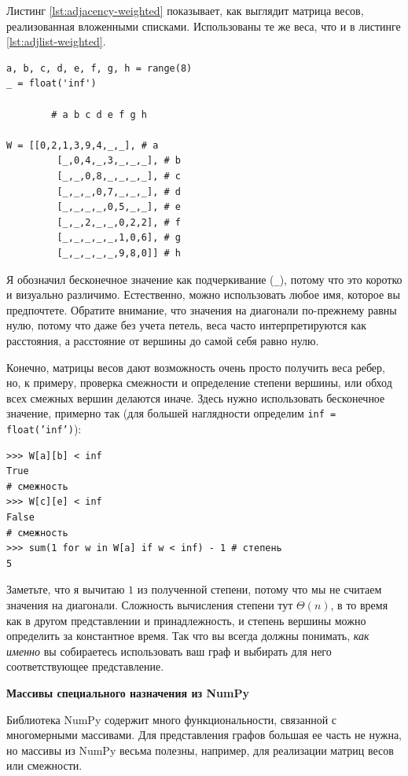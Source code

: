 Листинг \ref{lst:adjacency-weighted} показывает, как выглядит матрица весов, реализованная вложенными списками. Использованы те же веса, что и в листинге \ref{lst:adjlist-weighted}.

\begin{lstlisting}[caption={Матрица весов с бесконечными значениями для отсутствующих ребер}, label={lst:adjacency-weighted}]
a, b, c, d, e, f, g, h = range(8)
_ = float('inf')

		# a b c d e f g h

W = [[0,2,1,3,9,4,_,_], # a
	 	 [_,0,4,_,3,_,_,_], # b
		 [_,_,0,8,_,_,_,_], # c
		 [_,_,_,0,7,_,_,_], # d
		 [_,_,_,_,0,5,_,_], # e
		 [_,_,2,_,_,0,2,2], # f
		 [_,_,_,_,_,1,0,6], # g
		 [_,_,_,_,_,9,8,0]] # h
\end{lstlisting}

Я обозначил бесконечное значение как подчеркивание (\texttt{\_}), потому что это коротко и визуально различимо. Естественно, можно использовать любое имя, которое вы предпочтете. Обратите внимание, что значения на диагонали по-прежнему равны нулю, потому что даже без учета петель, веса часто интерпретируются как расстояния, а расстояние от вершины до самой себя равно нулю.

Конечно, матрицы весов дают возможность очень просто получить веса ребер, но, к примеру, проверка смежности и определение степени вершины, или обход всех смежных вершин делаются иначе. Здесь нужно использовать бесконечное значение, примерно так (для большей наглядности определим \texttt{inf = float('inf')}):
\begin{lstlisting}
>>> W[a][b] < inf
True
# смежность
>>> W[c][e] < inf
False
# смежность
>>> sum(1 for w in W[a] if w < inf) - 1 # степень
5
\end{lstlisting}

Заметьте, что я вычитаю $1$ из полученной степени, потому что мы не считаем значения на диагонали. Сложность вычисления степени тут $\Theta(n)$, в то время как в другом представлении и принадлежность, и степень вершины можно определить за константное время. Так что  вы всегда должны понимать, \textit{как именно} вы собираетесь использовать ваш граф и выбирать для него соответствующее представление.

\textbf{Массивы специального назначения из NumPy}

Библиотека NumPy содержит много функциональности, связанной с многомерными массивами. Для представления графов большая ее часть не нужна, но массивы из NumPy весьма полезны, например, для реализации матриц весов или смежности.

